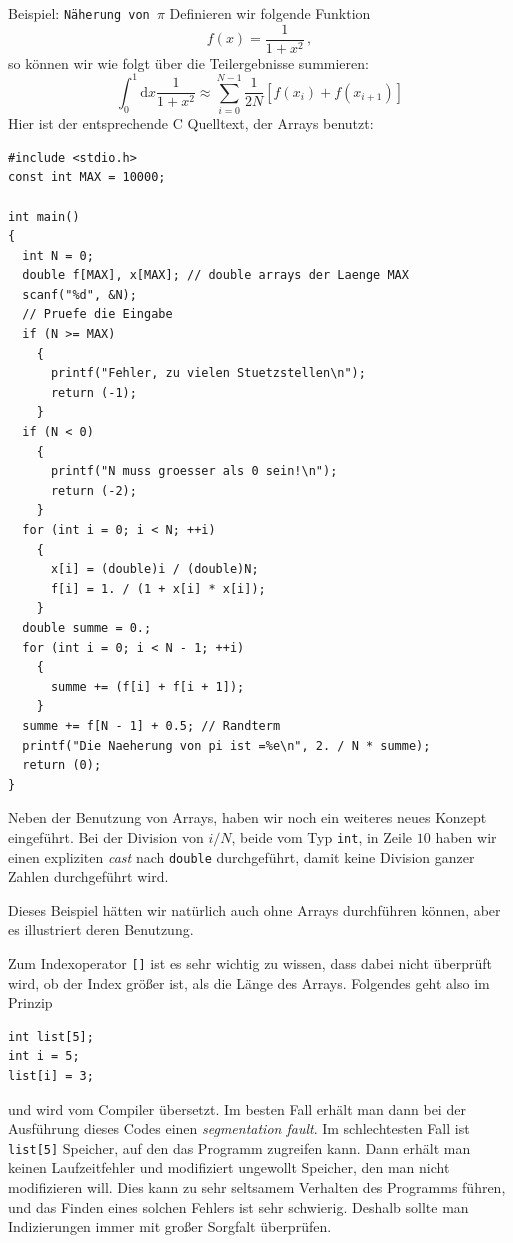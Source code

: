 \begin{myexampleprogram}{Beispiel: \texttt{Näherung von $\pi$}}
  Definieren wir folgende Funktion
  \[
  f(x) = \frac{1}{1+x^2}\,,
  \]
  so können wir wie folgt über die Teilergebnisse summieren:
  \begin{equation}
    \int_{0}^{1} \mathrm{d}x \dfrac{1}{1+x^2}\approx \sum_{i=0}^{N-1}\frac{1}{2N}[f(x_i)+f(x_{i+1})]
  \end{equation}
  Hier ist der entsprechende C Quelltext, der Arrays benutzt:
\begin{lstlisting}
#include <stdio.h>
const int MAX = 10000;

int main()
{
  int N = 0;
  double f[MAX], x[MAX]; // double arrays der Laenge MAX
  scanf("%d", &N);
  // Pruefe die Eingabe
  if (N >= MAX)
    {
      printf("Fehler, zu vielen Stuetzstellen\n");
      return (-1);
    }
  if (N < 0)
    {
      printf("N muss groesser als 0 sein!\n");
      return (-2);
    }
  for (int i = 0; i < N; ++i)
    {
      x[i] = (double)i / (double)N;
      f[i] = 1. / (1 + x[i] * x[i]);
    }
  double summe = 0.;
  for (int i = 0; i < N - 1; ++i)
    {
      summe += (f[i] + f[i + 1]);
    }
  summe += f[N - 1] + 0.5; // Randterm
  printf("Die Naeherung von pi ist =%e\n", 2. / N * summe);
  return (0);
}
\end{lstlisting}
  Neben der Benutzung von Arrays, haben wir noch ein weiteres neues Konzept eingeführt.
  Bei der Division von $i/N$, beide vom Typ \verb|int|, in Zeile $10$ haben wir einen expliziten \emph{cast} nach \verb|double| durchgeführt, damit keine Division ganzer Zahlen durchgeführt wird.

  Dieses Beispiel hätten wir natürlich auch ohne Arrays durchführen können, aber es illustriert deren Benutzung.
\end{myexampleprogram}

Zum Indexoperator \verb|[]| ist es sehr wichtig zu wissen, dass dabei nicht überprüft wird, ob der Index größer ist, als die Länge des Arrays.
Folgendes geht also im Prinzip
\begin{lstlisting}
int list[5];
int i = 5;
list[i] = 3;
\end{lstlisting}
und wird vom Compiler übersetzt.
Im besten Fall erhält man dann bei der Ausführung dieses Codes einen \emph{segmentation fault}.
Im schlechtesten Fall ist \verb|list[5]| Speicher, auf den das Programm zugreifen kann.
Dann erhält man keinen Laufzeitfehler und modifiziert ungewollt Speicher, den man nicht modifizieren will.
Dies kann zu sehr seltsamem Verhalten des Programms führen, und das Finden eines solchen Fehlers ist sehr schwierig.
Deshalb sollte man Indizierungen immer mit großer Sorgfalt überprüfen.

